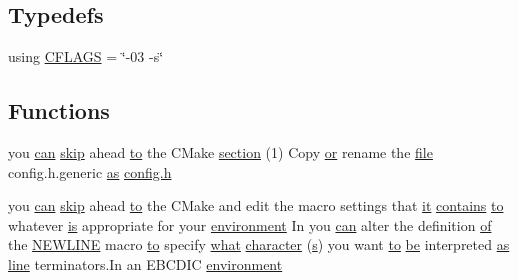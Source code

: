 \subsection*{Typedefs}
\begin{DoxyCompactItemize}
\item 
using \hyperlink{NON-AUTOTOOLS-BUILD_8txt_a584debe9e4020eaffb9dd784c705c74a}{C\+F\+L\+A\+GS} = \char`\"{}-\/03 -\/s\char`\"{}
\end{DoxyCompactItemize}
\subsection*{Functions}
\begin{DoxyCompactItemize}
\item 
you \hyperlink{pcre_8txt_a2a892895a50bc58f3679c7acb58190e6}{can} \hyperlink{pcregrep_8txt_a5d7d45836eef1c85f206401ed4ec7e40}{skip} ahead \hyperlink{pcretest_8txt_aa22c98f630e4b3fe86ee17ce5150c62f}{to} the C\+Make \hyperlink{NON-AUTOTOOLS-BUILD_8txt_a15f8d84883b73c7d20e72e75024d6dfd}{section} (1) Copy \hyperlink{pcretest_8txt_a1e1dbf0220a28f9a8c394172dd6da171}{or} rename the \hyperlink{pcregrep_8txt_ac062b5382a17ef4e936c49bdd74c5563}{file} config.\+h.\+generic \hyperlink{pcretest_8txt_a7681723cb91eaa99771ee87f8465c1aa}{as} \hyperlink{pcregrep_8txt_a373589baca2cb79ec87f46d6599640b9}{config.\+h}
\item 
you \hyperlink{pcre_8txt_a2a892895a50bc58f3679c7acb58190e6}{can} \hyperlink{pcregrep_8txt_a5d7d45836eef1c85f206401ed4ec7e40}{skip} ahead \hyperlink{pcretest_8txt_aa22c98f630e4b3fe86ee17ce5150c62f}{to} the C\+Make and edit the macro settings that \hyperlink{pcretest_8txt_ab977b64dbdb969ce031dc4281a792b3c}{it} \hyperlink{pcregrep_8txt_a86ea3bc1e89b0f504caffefe4068ef99}{contains} \hyperlink{pcretest_8txt_aa22c98f630e4b3fe86ee17ce5150c62f}{to} whatever \hyperlink{NON-AUTOTOOLS-BUILD_8txt_a2569119f3fd3f0d7d7ecea3c96acb0bf}{is} appropriate for your \hyperlink{pcre_8txt_a92eceb286226d511427eb87f298c6523}{environment} In you \hyperlink{pcre_8txt_a2a892895a50bc58f3679c7acb58190e6}{can} alter the definition \hyperlink{pcre_8txt_a9d5b55a535a7d176d14b62d664b47b4d}{of} the \hyperlink{NON-AUTOTOOLS-BUILD_8txt_ab26dfb3784697f4ae91f356713845063}{N\+E\+W\+L\+I\+NE} macro \hyperlink{pcretest_8txt_aa22c98f630e4b3fe86ee17ce5150c62f}{to} specify \hyperlink{group__apr__thread__proc_gaf132f350c1657f61f533df7066e903c4}{what} \hyperlink{NON-AUTOTOOLS-BUILD_8txt_a0ffd3c24610705c14869625bf3e2ccbb}{character} (\hyperlink{pcretest_8txt_a062597889ba244b72877454b1d3adecf}{s}) you want \hyperlink{pcretest_8txt_aa22c98f630e4b3fe86ee17ce5150c62f}{to} \hyperlink{NON-AUTOTOOLS-BUILD_8txt_ac08ce70cbd4f453457597ad15ecbebdd}{be} interpreted \hyperlink{pcretest_8txt_a7681723cb91eaa99771ee87f8465c1aa}{as} \hyperlink{README_8txt_a2cf996e2a4004681ed2e0dfbca5b7993}{line} terminators.\+In an E\+B\+C\+D\+IC \hyperlink{pcre_8txt_a92eceb286226d511427eb87f298c6523}{environment}

\end{DoxyCompactItemize}
